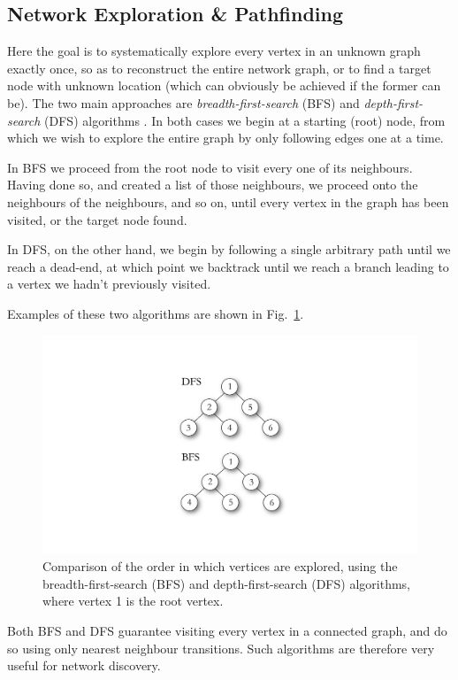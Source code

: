 \documentclass[aps,rmp,twocolumn,amsmath,amssymb,nofootinbib,superscriptaddress]{revtex4}
\begin{document}
%
%

\subsection{Network Exploration \& Pathfinding} \label{sec:path_exp}

Here the goal is to systematically explore every vertex in an unknown graph exactly once, so as to reconstruct the entire network graph, or to find a target node with unknown location (which can obviously be achieved if the former can be). The two main approaches are \emph{breadth-first-search} (BFS) and \emph{depth-first-search} (DFS) algorithms \cite{???}. In both cases we begin at a starting (root) node, from which we wish to explore the entire graph by only following edges one at a time.

In BFS we proceed from the root node to visit every one of its neighbours. Having done so, and created a list of those neighbours, we proceed onto the neighbours of the neighbours, and so on, until every vertex in the graph has been visited, or the target node found.

In DFS, on the other hand, we begin by following a single arbitrary path until we reach a dead-end, at which point we backtrack until we reach a branch leading to a vertex we hadn't previously visited.

Examples of these two algorithms are shown in Fig.~\ref{fig:BFS_DFS}.

\begin{figure}[!htb]
\includegraphics[width=0.6\columnwidth]{BFS_DFS}
\caption{Comparison of the order in which vertices are explored, using the breadth-first-search (BFS) and depth-first-search (DFS) algorithms, where vertex 1 is the root vertex.} \label{fig:BFS_DFS}
\end{figure}

Both BFS and DFS guarantee visiting every vertex in a connected graph, and do so using only nearest neighbour transitions. Such algorithms are therefore very useful for network discovery.
\end{document}

